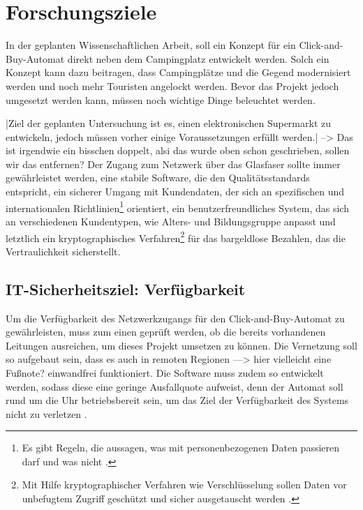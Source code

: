 \section{Forschungsziele}


In der geplanten Wissenschaftlichen Arbeit, soll ein Konzept für ein Click-and-Buy-Automat direkt neben
dem Campingplatz entwickelt werden. Solch ein Konzept kann dazu beitragen, dass Campingplätze und die Gegend
modernisiert werden und noch mehr Touristen angelockt werden. Bevor das Projekt jedoch umgesetzt werden kann, 
müssen noch wichtige Dinge beleuchtet werden. 


|Ziel der geplanten Untersuchung ist es, einen elektronischen Supermarkt zu entwickeln, jedoch müssen vorher 
einige Voraussetzungen erfüllt werden.| --> Das ist irgendwie ein bisschen doppelt, alsi das wurde oben schon geschrieben, sollen wir das entfernen?
Der Zugang zum Netzwerk über das Glasfaser sollte immer gewährleistet
werden, eine stabile Software, die den Qualitätsstandards entspricht, ein sicherer Umgang mit Kundendaten, 
der sich an spezifischen und internationalen Richtlinien\footnote{Es gibt Regeln, die aussagen, 
was mit personenbezogenen Daten passieren darf und was nicht \cite{refart:DSDS}.} orientiert, ein benutzerfreundliches
System, das sich an verschiedenen Kundentypen, wie Alters- und Bildungsgruppe anpasst und letztlich ein 
kryptographisches Verfahren\footnote{Mit Hilfe kryptographischer Verfahren wie Verschlüsselung sollen
Daten vor unbefugtem Zugriff geschützt und sicher ausgetauscht werden \cite{refart:SLWK}.} für das bargeldlose 
Bezahlen, das die Vertraulichkeit sicherstellt.


\subsection{IT-Sicherheitsziel: Verfügbarkeit}
Um die Verfügbarkeit des Netzwerkzugangs für den Click-and-Buy-Automat zu gewährleisten, muss zum einen 
geprüft werden, ob die bereits vorhandenen Leitungen ausreichen, um dieses Projekt umsetzen zu können.
Die Vernetzung soll so aufgebaut sein, dass es auch in remoten Regionen ---> hier vielleicht eine Fußnote?
einwandfrei funktioniert. 
Die Software muss zudem so entwickelt werden, sodass diese eine geringe Ausfallquote aufweist, 
denn der Automat soll rund um die Uhr betriebsbereit sein, um das Ziel der Verfügbarkeit des
Systems nicht zu verletzen \cite{refbook:SWIS}.

